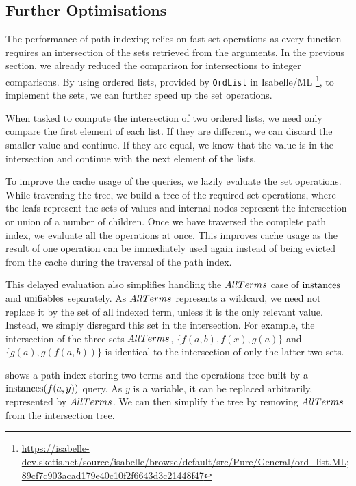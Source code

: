 \subsection{Further Optimisations}
The performance of path indexing relies on fast set operations as every function requires an intersection of the sets retrieved from the arguments. In the previous section, we already reduced the comparison for intersections to integer comparisons. By using ordered lists, provided by \lstinline{OrdList} in Isabelle/ML \footnote{\url{https://isabelle-dev.sketis.net/source/isabelle/browse/default/src/Pure/General/ord_list.ML;89cf7c903acad179e40c10f2f6643d3c21448f47}}, to implement the sets, we can further speed up the set operations.

When tasked to compute the intersection of two ordered lists, we need only compare the first element of each list. If they are different, we can discard the smaller value and continue. If they are equal, we know that the value is in the intersection and continue with the next element of the lists.

To improve the cache usage of the queries, we lazily evaluate the set operations. While traversing the tree, we build a tree of the required set operations, where the leafs represent the sets of values and internal nodes represent the intersection or union of a number of children. Once we have traversed the complete path index, we evaluate all the operations at once. This improves cache usage as the result of one operation can be immediately used again instead of being evicted from the cache during the traversal of the path index.

This delayed evaluation also simplifies handling the $AllTerms$ case of $\mathrm{instances}$ and $\mathrm{unifiables}$ separately. As $AllTerms$ represents a wildcard, we need not replace it by the set of all indexed term, unless it is the only relevant value. Instead, we simply disregard this set in the intersection. For example, the intersection of the three sets $AllTerms$, $\{f(a,b), f(x), g(a)\}$ and $\{g(a), g(f(a,b))\}$ is identical to the intersection of only the latter two sets.

 shows a path index storing two terms and the operations tree built by a $\mathrm{instances} (f(a,y))$ query. As $y$ is a variable, it can be replaced arbitrarily, represented by $AllTerms$. We can then simplify the tree by removing $AllTerms$ from the intersection tree.

